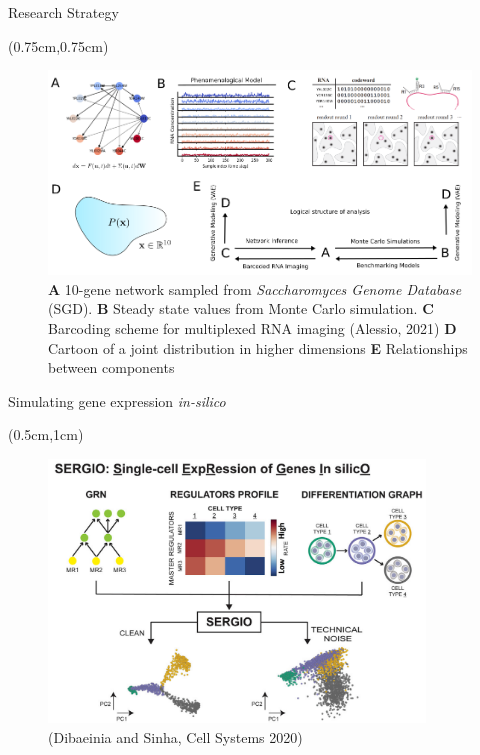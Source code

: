 \documentclass[aspectratio=1610]{beamer}					%
\begin{document}
\begin{frame}{Research Strategy}

\begin{textblock*}{14cm}(0.75cm,0.75cm)
\begin{figure}
\includegraphics[width=14cm]{logic.png}
\caption{\textbf{A} 10-gene network sampled from \emph{Saccharomyces Genome Database} (SGD). \textbf{B} Steady state values from Monte Carlo simulation. \textbf{C} Barcoding scheme for multiplexed RNA imaging (Alessio, 2021) \textbf{D} Cartoon of a joint distribution in higher dimensions \textbf{E} Relationships between components}
\end{figure}
\end{textblock*}

\end{frame}

\begin{frame}{Simulating gene expression \emph{in-silico}}
\begin{textblock*}{15cm}(0.5cm,1cm)
\begin{figure}
\includegraphics[width=10cm]{sergio.png}
\caption{(Dibaeinia and Sinha, Cell Systems 2020)}
\end{figure}
\end{textblock*}
\end{frame}
\end{document}
